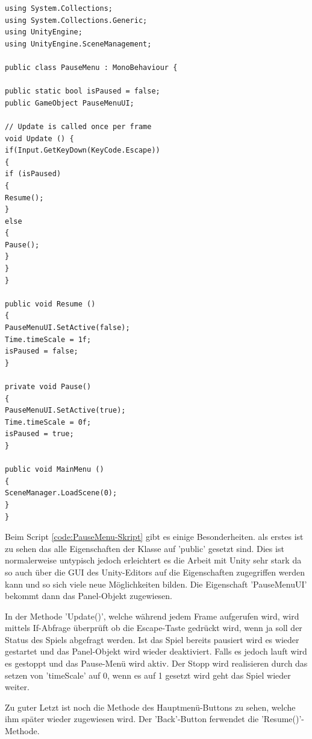 \begin{lstlisting}[language={[Sharp]C}, caption=PauseMenu-Skript, label=code:PauseMenu-Skript]
using System.Collections;
using System.Collections.Generic;
using UnityEngine;
using UnityEngine.SceneManagement;

public class PauseMenu : MonoBehaviour {

public static bool isPaused = false;
public GameObject PauseMenuUI;

// Update is called once per frame
void Update () {
if(Input.GetKeyDown(KeyCode.Escape))
{
if (isPaused)
{
Resume();
}
else
{
Pause();
}
}
}

public void Resume ()
{
PauseMenuUI.SetActive(false);
Time.timeScale = 1f;
isPaused = false;
}

private void Pause()
{
PauseMenuUI.SetActive(true);
Time.timeScale = 0f;
isPaused = true;
}

public void MainMenu ()
{
SceneManager.LoadScene(0);
}
}
\end{lstlisting}
Beim Script \cref{code:PauseMenu-Skript} gibt es einige Besonderheiten. als erstes ist zu sehen das alle Eigenschaften der Klasse auf 'public' gesetzt sind. Dies ist normalerweise untypisch jedoch erleichtert es die Arbeit mit Unity sehr stark da so auch über die GUI des Unity-Editors auf die Eigenschaften zugegriffen werden kann und so sich viele neue Möglichkeiten bilden. Die Eigenschaft 'PauseMenuUI' bekommt dann das Panel-Objekt zugewiesen.

In der Methode 'Update()', welche während jedem Frame aufgerufen wird, wird mittels If-Abfrage überprüft ob die Escape-Taste gedrückt wird, wenn ja soll der Status des Spiels abgefragt werden. Ist das Spiel bereits pausiert wird es wieder gestartet und das Panel-Objekt wird wieder deaktiviert. Falls es jedoch lauft wird es gestoppt und das Pause-Menü wird aktiv. Der Stopp wird realisieren durch das setzen von 'timeScale' auf 0, wenn es auf 1 gesetzt wird geht das Spiel wieder weiter.

Zu guter Letzt ist noch die Methode des Hauptmenü-Buttons zu sehen, welche ihm später wieder zugewiesen wird. Der 'Back'-Button ferwendet die 'Resume()'-Methode.

